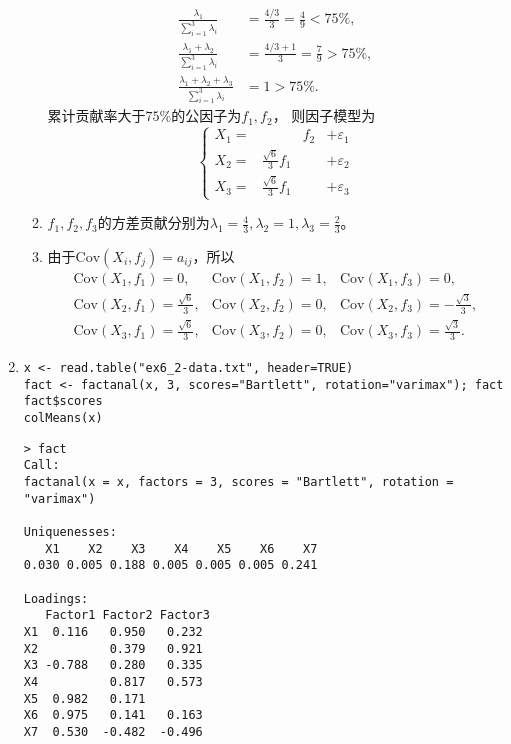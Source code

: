 \begin{enumerate}
\begin{enumerate}[label=(\arabic*)]
\begin{align*}
                \frac{\lambda_1}{\sum\limits_{i=1}^3 \lambda_i} & =\frac{4/3}{3}=\frac{4}{9}<75\%,\\
                \frac{\lambda_1+\lambda_2}{\sum\limits_{i=1}^3 \lambda_i} & =\frac{4/3+1}{3}=\frac{7}{9}>75\%,\\
                \frac{\lambda_1+\lambda_2+\lambda_3}{\sum\limits_{i=1}^3 \lambda_i} & =1>75\%.
            \end{align*}
            累计贡献率大于$75\%$的公因子为$f_1,f_2$，
            则因子模型为
            \[\left\{\begin{array}{cccc}
                X_1=& &f_2 & + \varepsilon_1\\
                X_2=&\frac{\sqrt{6}}{3}f_1 & & + \varepsilon_2\\
                X_3=&\frac{\sqrt{6}}{3}f_1 & & + \varepsilon_3
                \end{array}\right.\]
            \item $f_1,f_2,f_3$的方差贡献分别为$\displaystyle\lambda_1=\frac{4}{3},\lambda_2=1,\lambda_3=\frac{2}{3}$。
            \item 由于$\mathrm{Cov}(X_i,f_j)=a_{ij}$，所以
            \[\begin{array}{ccc}
                \mathrm{Cov}(X_1,f_1)=0, & \mathrm{Cov}(X_1,f_2)=1, & \mathrm{Cov}(X_1,f_3)=0,\\
                \mathrm{Cov}(X_2,f_1)=\frac{\sqrt{6}}{3}, & \mathrm{Cov}(X_2,f_2)=0, & \mathrm{Cov}(X_2,f_3)=-\frac{\sqrt{3}}{3},\\
                \mathrm{Cov}(X_3,f_1)=\frac{\sqrt{6}}{3}, & \mathrm{Cov}(X_3,f_2)=0, & \mathrm{Cov}(X_3,f_3)=\frac{\sqrt{3}}{3}.
                \end{array}\]
        \end{enumerate}
        \item
        \code
\begin{lstlisting}
x <- read.table("ex6_2-data.txt", header=TRUE)
fact <- factanal(x, 3, scores="Bartlett", rotation="varimax"); fact
fact$scores
colMeans(x)
\end{lstlisting}
        \out
\begin{lstlisting}
> fact
Call:
factanal(x = x, factors = 3, scores = "Bartlett", rotation = "varimax")

Uniquenesses:
   X1    X2    X3    X4    X5    X6    X7 
0.030 0.005 0.188 0.005 0.005 0.005 0.241 

Loadings:
   Factor1 Factor2 Factor3
X1  0.116   0.950   0.232 
X2          0.379   0.921 
X3 -0.788   0.280   0.335 
X4          0.817   0.573 
X5  0.982   0.171         
X6  0.975   0.141   0.163 
X7  0.530  -0.482  -0.496 


\end{lstlisting}
\end{enumerate}
